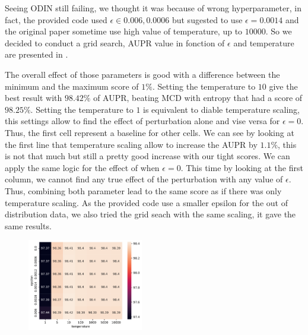Seeing ODIN still failing, we thought it was because of wrong hyperparameter, in fact, the provided code used $ \epsilon \in {0.006, 0.0006} $ but sugested to use $ \epsilon = 0.0014 $ and the original paper sometime use high value of temperature, up to $10000$. So we decided to conduct a grid search, AUPR value in fonction of $ \epsilon  $ and temperature are presented in .

The overall effect of those parameters is good with a difference between the minimum and the maximum score of $ 1\% $. Setting the temperature to $ 10 $ give the best result with $ 98.42\% $ of AUPR, beating MCD with entropy that had a score of $ 98.25\% $.
Setting the temperature to $ 1 $ is equivalent to diable temperature scaling, this settings allow to find the effect of perturbation alone and vise versa for $ \epsilon = 0 $. Thus, the first cell represent a baseline for other cells. 
We can see by looking at the first line that temperature scaling allow to increase the AUPR by $ 1.1\% $, this is not that much but still a pretty good increase with our tight scores. We can apply the same logic for the effect of  when $ \epsilon = 0 $. This time by looking at the first column, we cannot find any true effect of the perturbation with any value of $ \epsilon $. Thus, combining both parameter lead to the same score as if there was only temperature scaling. As the provided code use a smaller epsilon for the out of distribution data, we also tried the grid seach with the same scaling, it gave the same results.
\begin{figure}[H]
    \centering
    \includegraphics[width=0.45\textwidth]{odin_grid_search.pdf}
    \caption{}
    \label{fig:odin_grid_search}
\end{figure}